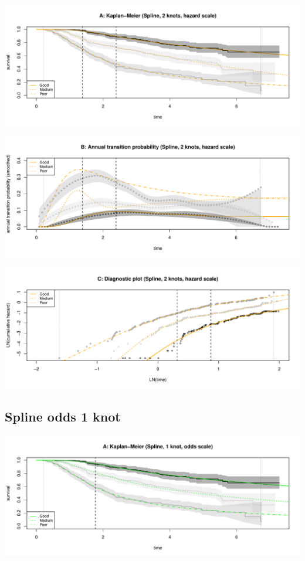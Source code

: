 \documentclass[]{article}
\begin{document}
\begin{flushleft}\includegraphics[height=0.3\textheight]{Images/spline_hazard2-1} \end{flushleft}

\begin{flushleft}\includegraphics[height=0.3\textheight]{Images/spline_hazard2-2} \end{flushleft}

\begin{flushleft}\includegraphics[height=0.3\textheight]{Images/spline_hazard2-3} \end{flushleft}

\subsection{Spline odds 1 knot}\label{spline-odds-1-knot}

\begin{flushleft}\includegraphics[height=0.3\textheight]{Images/spline_odds1-1} \end{flushleft}
\end{document}
